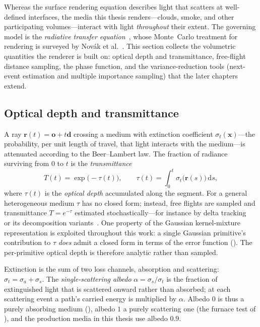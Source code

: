 Whereas the surface rendering equation describes light that scatters at well-defined interfaces,
the media this thesis renders---clouds, smoke, and other participating volumes---interact with
light \emph{throughout} their extent. The governing model is the \emph{radiative transfer
equation}~\cite{Chandrasekhar1960}, whose Monte~Carlo treatment for rendering is surveyed by
Nov\'ak et al.~\cite{Novak2018}. This section collects the volumetric quantities the renderer is built
on: optical depth and transmittance, free-flight distance sampling, the phase function, and the
variance-reduction tools (next-event estimation and multiple importance sampling) that the later
chapters extend.

\subsection{Optical depth and transmittance}

A ray $\bm{r}(t)=\bm{o}+t\bm{d}$ crossing a medium with extinction coefficient $\sigma_t(\bm{x})$---the probability, per
unit length of travel, that light interacts with the medium---is attenuated according to
the Beer--Lambert law. The fraction of radiance
surviving from $0$ to $t$ is the \emph{transmittance}
\[
  T(t) = \exp\!\big(-\tau(t)\big), \qquad
  \tau(t) = \int_0^{t} \sigma_t\big(\bm{r}(s)\big)\,\mathrm{d}s,
\]
where $\tau(t)$ is the \emph{optical depth} accumulated along the segment. For a general
heterogeneous medium $\tau$ has no closed form; instead, free flights are sampled and transmittance
$T = e^{-\tau}$ estimated stochastically---for instance by delta tracking~\cite{Woodcock1965} or its
decomposition variants~\cite{Kutz2017}. One property of the Gaussian kernel-mixture representation
is exploited throughout this work: a single Gaussian primitive's contribution to $\tau$ \emph{does}
admit a closed form in terms of the error function (). The per-primitive optical depth is therefore analytic rather than sampled.

Extinction is the sum of two loss channels, absorption and scattering:
$\sigma_t = \sigma_a + \sigma_s$. The \emph{single-scattering albedo}
$\alpha = \sigma_s/\sigma_t$ is the fraction of extinguished light that is scattered
onward rather than absorbed; at each scattering event a path's carried energy is
multiplied by $\alpha$. Albedo $0$ is thus a purely absorbing medium
(), albedo $1$ a purely scattering one (the furnace test of
), and the production media in this thesis use albedo $0.9$.

